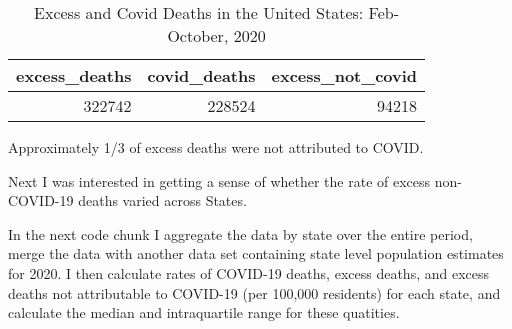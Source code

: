 \documentclass[
]{article}
\newenvironment{Shaded}{\begin{snugshade}}{\end{snugshade}}
\newcommand{\DataTypeTok}[1]{\textcolor[rgb]{0.13,0.29,0.53}{#1}}
\newcommand{\DecValTok}[1]{\textcolor[rgb]{0.00,0.00,0.81}{#1}}
\newcommand{\KeywordTok}[1]{\textcolor[rgb]{0.13,0.29,0.53}{\textbf{#1}}}
\newcommand{\NormalTok}[1]{#1}
\newcommand{\OperatorTok}[1]{\textcolor[rgb]{0.81,0.36,0.00}{\textbf{#1}}}
\newcommand{\StringTok}[1]{\textcolor[rgb]{0.31,0.60,0.02}{#1}}
\begin{document}
\begin{Shaded}
\end{Shaded}

\begin{table}

\caption{\label{tab:unnamed-chunk-5}Excess and Covid Deaths in the United States: Feb-October, 2020}
\centering
\begin{tabular}[t]{r|r|r}
\hline
excess\_deaths & covid\_deaths & excess\_not\_covid\\
\hline
322742 & 228524 & 94218\\
\hline
\end{tabular}
\end{table}

Approximately 1/3 of excess deaths were not attributed to COVID.

Next I was interested in getting a sense of whether the rate of excess
non-COVID-19 deaths varied across States.

In the next code chunk I aggregate the data by state over the entire
period, merge the data with another data set containing state level
population estimates for 2020. I then calculate rates of COVID-19
deaths, excess deaths, and excess deaths not attributable to COVID-19
(per 100,000 residents) for each state, and calculate the median and
intraquartile range for these quatities.
\end{document}
